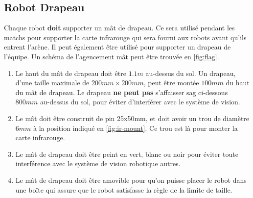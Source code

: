 \subsection{Robot Drapeau}
\label{sub:Flags}

Chaque robot \textbf{doit} supporter un mât de drapeau. Ce sera utilisé pendant les matchs pour supporter la carte infrarouge qui sera fourni aux robots avant qu'ils entrent l'arène. Il peut également être utilisé pour supporter un drapeau de l'équipe.  Un schéma de l'agencement mât peut être trouvée en \autoref{fig:flag}.

\begin{enumerate}
\item Le haut du mât de drapeau doit être $1.1m$ au-dessus du sol. Un drapeau, d'une taille maximale de $200mm \times 200mm$, peut être montée $100mm$ du haut du mât de drapeau. Le drapeau \textbf{ne peut pas} s'affaisser sag ci-dessous $800mm$ au-dessus du sol, pour éviter d'interférer avec le système de vision.

\item Le mât doit être construit de pin 25x50mm, et doit avoir un trou de diamètre $6mm$ à la position indiqué en \autoref{fig:ir-mount}. Ce trou est là pour monter la carte infrarouge.

\item Le mât de drapeau doit être peint en vert, blanc ou noir pour éviter toute interférence avec le système de vision robotique autres.

\item Le mât de drapeau doit être amovible pour qu'on puisse placer le robot dans une boîte qui assure que le robot satisfasse la règle de la limite de taille.
\end{enumerate}


